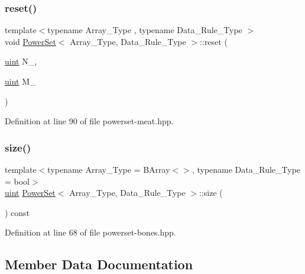 \subsubsection{\texorpdfstring{reset()}{reset()}}
{\footnotesize\ttfamily template$<$typename Array\+\_\+\+Type , typename Data\+\_\+\+Rule\+\_\+\+Type $>$ \\
void \hyperlink{class_power_set}{Power\+Set}$<$ Array\+\_\+\+Type, Data\+\_\+\+Rule\+\_\+\+Type $>$\+::reset (\begin{DoxyParamCaption}\item[{\hyperlink{typedefs_8hpp_a91ad9478d81a7aaf2593e8d9c3d06a14}{uint}}]{N\+\_\+,  }\item[{\hyperlink{typedefs_8hpp_a91ad9478d81a7aaf2593e8d9c3d06a14}{uint}}]{M\+\_\+ }\end{DoxyParamCaption})\hspace{0.3cm}{\ttfamily [inline]}}



Definition at line 90 of file powerset-\/meat.\+hpp.

\mbox{\label{class_power_set_a80e7099e115369326e6c873a92d270f9}} 
\subsubsection{\texorpdfstring{size()}{size()}}
{\footnotesize\ttfamily template$<$typename Array\+\_\+\+Type  = B\+Array$<$$>$, typename Data\+\_\+\+Rule\+\_\+\+Type  = bool$>$ \\
\hyperlink{typedefs_8hpp_a91ad9478d81a7aaf2593e8d9c3d06a14}{uint} \hyperlink{class_power_set}{Power\+Set}$<$ Array\+\_\+\+Type, Data\+\_\+\+Rule\+\_\+\+Type $>$\+::size (\begin{DoxyParamCaption}{ }\end{DoxyParamCaption}) const\hspace{0.3cm}{\ttfamily [inline]}}



Definition at line 68 of file powerset-\/bones.\+hpp.



\subsection{Member Data Documentation}
\mbox{\label{class_power_set_a99cfef97c3a457ea7be1b000b39f41d9}} 
